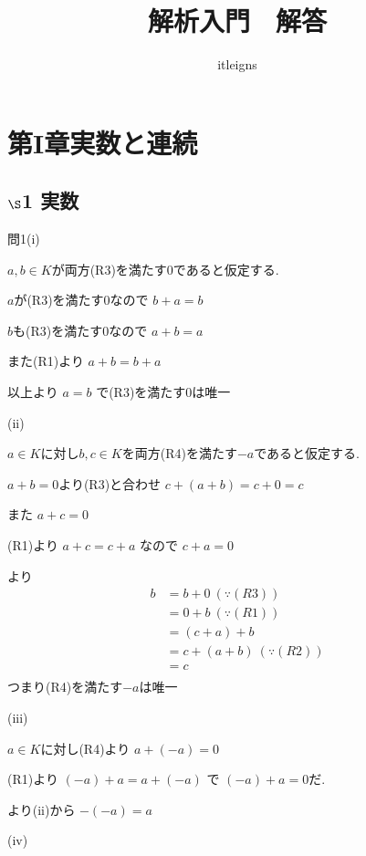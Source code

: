 \documentclass{jsarticle}
\title{解析入門　解答}
\author{itleigns}
\begin{document}
       \maketitle{}
       \section*{第I章実数と連続}
       \subsection*{$\S$1 実数}
       問1(i)
       
       $a,b\in K$が両方(R3)を満たす0であると仮定する.
       
       $a$が(R3)を満たす$0$なので
       $b+a=b$
       
       $b$も(R3)を満たす$0$なので
       $a+b=a$
       
       また(R1)より
       $a+b=b+a$
       
       
       以上より
       $a=b$
       で(R3)を満たす0は唯一
       
       
       (ii)
       
       $a\in K$に対し$b,c\in K$を両方(R4)を満たす$-a$であると仮定する.
       
       $a+b = 0$より(R3)と合わせ
       $c+(a+b)=c+0=c$
       
       また
       $a+c=0$
       
       
       (R1)より
       $a+c=c+a$
       なので
       $c+a=0$
       
       
       より
       \begin{align*}
       b &= b+0 \ (\because (R3))\\
       &= 0+b \ (\because (R1))\\
       &= (c+a)+b\\
       &= c+(a+b) \ (\because (R2))\\
       &= c \\
       \end{align*}
       つまり(R4)を満たす$-a$は唯一
       
       
       (iii)
       
       $a\in K$に対し(R4)より
       $a+(-a)=0$
       
       
       (R1)より
       $(-a)+a=a+(-a)$
       で
       $(-a)+a=0$だ.
       
       より(ii)から
       $-(-a)=a$
       
       (iv)
       
\end{document}
